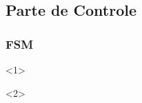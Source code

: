 \documentclass{beamer}
\begin{document}
    \subsection{Parte de Controle}
    \begin{frame}
        \frametitle{FSM}
        \begin{onlyenv}<1>
            \begin{figure}[h]
                \centering
            \end{figure}
        \end{onlyenv}

        \begin{onlyenv}<2>
          \begin{figure}[h]
            \centering
          \end{figure}
        \end{onlyenv}
    \end{frame}
\end{document}

